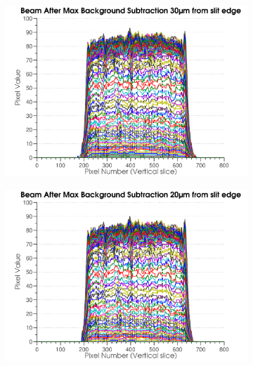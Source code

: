 \begin{figure}
\begin{subfigure}[b]{0.45\textwidth}
                \includegraphics[width=\textwidth]{figures/beam/fig_beam_blind_thres170_max.pdf}
                \caption{}
                \label{figallbeams7}
        \end{subfigure}
				\qquad
        \begin{subfigure}[b]{0.45\textwidth}
                \centering
                \includegraphics[width=\textwidth]{figures/beam/fig_beam_blind_thres160_max.pdf}
                \caption{}
                \label{figallbeams8}
        \end{subfigure}
		\label{figallbeams}
\end{figure}

